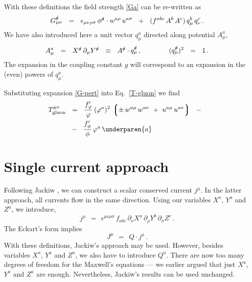 \documentclass[epsfig,12pt]{article}
\def\beq{\begin{equation}}
\def\eeq{\end{equation}}
\newcommand{\p}{\partial}
\newcommand{\lgr}{\left\lgroup}
\newcommand{\rgr}{\right\rgroup}
\begin{document}
	With these definitions the field strength \eqref{Ga} can be re-written as
\beq
\label{G-pert}
	G_{\mu\nu}^\slashed a    ~~=~~    \epsilon_{\mu\nu\rho\sigma}\, \phi^\slashed{a} \cdot w^{a\rho}\, u^{a\sigma}
				 ~~+~~  ( f^{abc}\, A^b\, A^c )\, q_\mu^b\, q_\nu^c\,.
\eeq
	We have also introduced here a unit vector $ q^a_\mu $ directed along potential $ A_\mu^a $,
\beq
	A_\mu^a    ~~=~~    X^\slashed a\, \p_\mu Y^\slashed a    ~~\equiv~~    A^\slashed a \cdot q_\mu^\slashed a\,,
	\qquad\qquad
	( q_\mu^\slashed a )^2    ~~=~~    1\,.
\eeq
	The expansion in the coupling constant $ g $ will correspond to an expansion in the (even) powers of $ q_\mu^a $.

	Substituting expansion \eqref{G-pert} into Eq.~\eqref{T-gluon} we find
\begin{align*}
%
	T_\text{gluon}^{\mu\nu}    & ~~=~~    \frac{f^\prime_\varphi}{\varphi}\, (\varphi^a)^2\,
					      \lgr \pm\, w^{a\mu}\, w^{a\nu}  ~+~  u^{a\mu}\, u^{a\nu} \rgr    ~~-~~
	\\
%
				   & ~~-~~  \frac{f^\prime_\phi}{\phi}\, \varphi^a\, \underparen{a}
\end{align*}




\section{Single current approach}
	Following Jackiw \cite{}, we can construct a scalar conserved current $ j^\mu $.
	In the latter approach, all currents flow in the same direction. 
	Using our variables $ X^a $, $ Y^a $ and $ Z^a $, we introduce,
\beq
	j^\mu    ~~=~~    \epsilon^{\mu\nu\rho\sigma}\, f_{abc}\, \p_\nu X^a\, \p_\rho Y^b\, \p_\sigma Z^c\,.
\eeq
	The Eckart's form \cite{} implies\,
\beq
	J^\mu    ~~=~~    Q \cdot j^\mu\,.
\eeq
	With these definitions, Jackiw's approach may be used.
	However, besides variables $ X^a $, $ Y^a $ and $ Z^a $, we also have to introduce $ Q^a $.
	There are now too many degrees of freedom for the Maxwell's equations --- we earlier
	argued that just $ X^a $, $ Y^a $ and $ Z^a $ are enough.
	Nevertheless, Jackiw's results can be used unchanged.
\end{document}
